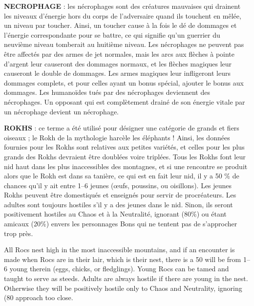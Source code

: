 \label{monstre-necrophage}\textbf{NECROPHAGE} : les nécrophages sont des créatures mauvaises qui drainent les niveaux d'énergie hors du corps de l'adversaire quand ils touchent en mêlée, un niveau par toucher. Ainsi, un toucher cause à la fois le dé de dommages et l'énergie correspondante pour se battre, ce qui signifie qu'un guerrier du neuvième niveau tomberait au huitième niveau. Les nécrophages ne peuvent pas être affectés par des armes de jet normales, mais les arcs aux flèches à pointe d'argent leur causeront des dommages normaux, et les flèches magiques leur causeront le double de dommages. Les armes magiques leur infligeront leurs dommages complets, et pour celles ayant un bonus spécial, ajouter le bonus aux dommages. Les humanoïdes tués par des nécrophages deviennent des nécrophages. Un opposant qui est complètement drainé de son énergie vitale par un nécrophage devient un nécrophage.

\bigskip

\label{monstre-rokh}\textbf{ROKHS} : ce terme a été utilisé pour désigner une catégorie de grands et fiers oiseaux ; le Rokh de la mythologie harcèle les éléphants ! Ainsi, les données fournies pour les Rokhs sont relatives aux petites variétés, et celles pour les plus grands des Rokhs devraient être doublées voire triplées. Tous les Rokhs font leur nid haut dans les plus inaccessibles des montagnes, et si une rencontre se produit alors que le Rokh est dans sa tanière, ce qui est en fait leur nid, il y a 50 \% de chances qu'il y ait entre 1--6 jeunes (œufs, poussins, ou oisillons). Les jeunes Rokhs peuvent être domestiqués et enseignés pour servir de procréateurs. Les adultes sont toujours hostiles s'il y a des jeunes dans le nid. Sinon, ils seront positivement hostiles au Chaos et à la Neutralité, ignorant (80\%) ou étant amicaux (20\%) envers les personnages Bons qui ne tentent pas de s'approcher trop près.



 All Rocs nest high in the most inaccessible mountains, and if an encounter
is made when Rocs are in their lair, which is their nest, there is a 50%
will be from 1–6 young therein (eggs, chicks, or ﬂedglings). Young Rocs can be
tamed and taught to serve as steeds. Adults are always hostile if there are young
in the nest. Otherwise they will be positively hostile only to Chaos and Neutrality,
ignoring (80%
approach too close.




